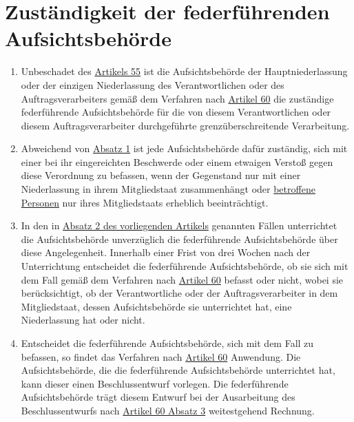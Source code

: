 \chapter{Zuständigkeit der federführenden Aufsichtsbehörde}
\label{ch:56}


\begin{enumerate}

  \item Unbeschadet des \hyperref[ch:55]{Artikels 55} ist die Aufsichtsbehörde der Hauptniederlassung oder der einzigen
   Niederlassung des Verantwortlichen oder des Auftragsverarbeiters gemäß dem Verfahren nach \hyperref[ch:60]
   {Artikel 60} die zuständige federführende Aufsichtsbehörde für die von diesem Verantwortlichen oder diesem
   Auftragsverarbeiter durchgeführte grenzüberschreitende Verarbeitung.
  \label{itm:56-1}

  \item Abweichend von \hyperref[itm:56-1]{Absatz 1} ist jede Aufsichtsbehörde dafür zuständig, sich mit einer bei ihr
   eingereichten Beschwerde oder einem etwaigen Verstoß gegen diese Verordnung zu befassen, wenn der Gegenstand nur mit
   einer Niederlassung in ihrem Mitgliedstaat zusammenhängt oder \hyperref[itm:04-1]{betroffene Personen} nur ihres Mitgliedstaats erheblich
   beeinträchtigt.
  \label{itm:56-2}

  \item In den in \hyperref[itm:56-2]{Absatz 2 des vorliegenden Artikels} genannten Fällen unterrichtet die
   Aufsichtsbehörde unverzüglich die federführende Aufsichtsbehörde über diese Angelegenheit. Innerhalb einer Frist von
   drei Wochen nach der Unterrichtung entscheidet die federführende Aufsichtsbehörde, ob sie sich mit dem Fall gemäß
   dem Verfahren nach \hyperref[ch:60]{Artikel 60} befasst oder nicht, wobei sie berücksichtigt, ob der Verantwortliche
   oder der Auftragsverarbeiter in dem Mitgliedstaat, dessen Aufsichtsbehörde sie unterrichtet hat, eine Niederlassung
   hat oder nicht.
  \label{itm:56-3}

  \item Entscheidet die federführende Aufsichtsbehörde, sich mit dem Fall zu befassen, so findet das Verfahren nach
   \hyperref[ch:60]{Artikel 60} Anwendung. Die Aufsichtsbehörde, die die federführende Aufsichtsbehörde unterrichtet
    hat, kann dieser einen Beschlussentwurf vorlegen. Die federführende Aufsichtsbehörde trägt diesem Entwurf bei der
    Ausarbeitung des Beschlussentwurfs nach \hyperref[itm:60-3]{Artikel 60 Absatz 3} weitestgehend Rechnung.
  \label{itm:56-4}


\end{enumerate}
